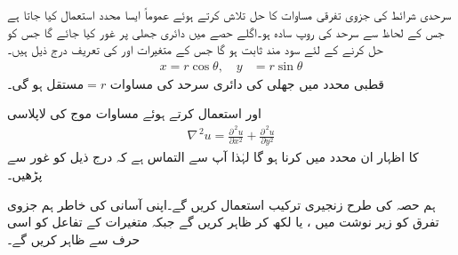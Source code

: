 سرحدی شرائط  کی جزوی تفرقی مساوات کا حل تلاش کرتے ہوئے  عموماً ایسا محدد استعمال کیا جاتا ہے جس کے لحاظ سے سرحد کی روپ سادہ ہو۔اگلے حصے میں دائری جھلی پر غور کیا جائے گا جس کو حل کرنے کے لئے  سود مند ثابت ہو گا جس کے متغیرات  اور  کی تعریف درج ذیل ہیں۔
\begin{align*}
x=r\cos \theta, \quad y&=r\sin \theta
\end{align*}
قطبی محدد میں جھلی کی  دائری سرحد کی مساوات 
$\text{مستقل}=r$
 ہو گی۔ 

 اور  استعمال کرتے ہوئے مساوات موج کی لاپلاسی
\begin{align*}
\nabla^{\,2}u=\frac{\partial^{\,2}u}{\partial x^2}+\frac{\partial^{\,2}u}{\partial y^2}
\end{align*}
کا اظہار ان محدد میں کرنا ہو گا لہٰذا آپ سے التماس ہے کہ درج ذیل کو غور سے پڑھیں۔

 ہم حصہ  کی طرح زنجیری ترکیب استعمال کریں گے۔اپنی آسانی کی خاطر ہم جزوی تفرق کو زیر نوشت میں ،  یا  لکھ کر ظاہر کریں گے جبکہ متغیرات   کے تفاعل  کو اسی حرف  سے ظاہر کریں گے۔

